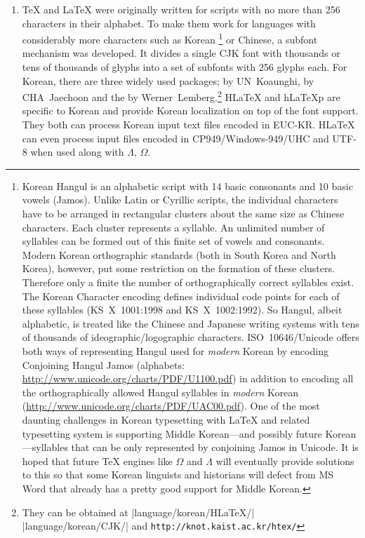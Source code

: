 \begin{enumerate}
\item \TeX{} and \LaTeX{} were originally written for
scripts with no more than 256 characters in their alphabet.
To make them work for languages with considerably 
more characters such as
Korean%
 \footnote{Korean Hangul is an alphabetic script with 14 basic consonants
 and 10 basic vowels (Jamos). Unlike Latin or Cyrillic scripts, the
 individual characters have to be arranged in rectangular
 clusters about the same size as Chinese characters. Each cluster
 represents a syllable. An unlimited number of syllables can be
 formed out of this finite set of vowels and consonants. Modern Korean
 orthographic standards (both in South Korea and  North Korea), however,
 put some restriction on the formation of these clusters.
 Therefore only a finite the number of  orthographically correct syllables exist.
 The Korean Character encoding defines individual code points for each of these syllables (KS~X~1001:1998 and KS~X~1002:1992). So Hangul, albeit alphabetic, is
 treated like the Chinese and Japanese writing systems with tens of thousands of
 ideographic/logographic characters.  ISO~10646/Unicode offers both ways of
 representing Hangul used for \emph{modern} Korean by encoding Conjoining
 Hangul Jamos (alphabets: \url{http://www.unicode.org/charts/PDF/U1100.pdf})
 in addition to encoding all the orthographically allowed Hangul syllables in
 \emph{modern} Korean (\url{http://www.unicode.org/charts/PDF/UAC00.pdf}).
 One of the most daunting challenges in Korean typesetting with
 \LaTeX{} and related typesetting system is supporting Middle Korean---and possibly future Korean---syllables that can be only represented
 by conjoining Jamos in Unicode. It is hoped that future \TeX{} engines like $\Omega$ and
 $\Lambda$ will eventually provide solutions to this
 so that some Korean linguists and historians
 will defect from MS Word that already has  a pretty good support 
 for Middle Korean.}
or Chinese, a subfont mechanism was developed.
It divides a single CJK font with  thousands or tens of thousands of
glyphs into a set of subfonts with 256 glyphs each. 
For Korean, there are three widely used packages;  
by UN~Koaunghi,  by CHA~Jaechoon and the 
by Werner~Lemberg.\footnote{%
They can be obtained at \CTANref|language/korean/HLaTeX/|\\
   \CTANref|language/korean/CJK/| and
   \texttt{http://knot.kaist.ac.kr/htex/}}
H\LaTeX{} and h\LaTeX{}p are specific to Korean and provide
Korean localization on top of the font support.
They both can process Korean input text files encoded in EUC-KR. H\LaTeX{} can
even process input files encoded in CP949/Windows-949/UHC and UTF-8
when used along with $\Lambda$, $\Omega$.


\end{enumerate}
